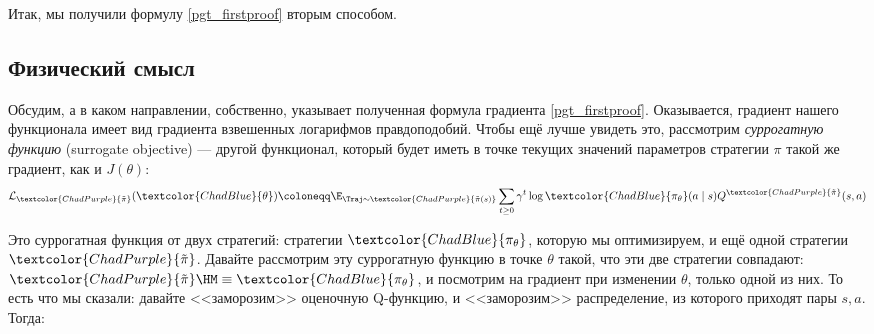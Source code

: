 Итак, мы получили формулу \eqref{pgt_firstproof} вторым способом.

\subsection{Физический смысл}

Обсудим, а в каком направлении, собственно, указывает полученная формула градиента \eqref{pgt_firstproof}. Оказывается, градиент нашего функционала имеет вид градиента взвешенных логарифмов правдоподобий. Чтобы ещё лучше увидеть это, рассмотрим \emph{суррогатную функцию} (surrogate objective) --- другой функционал, который будет иметь в точке текущих значений параметров стратегии $\pi$ такой же градиент, как и $J(\theta)$:
\begin{equation}\label{surrogateobj}
\mathcal{L}_{\textcolor{ChadPurple}{\tilde{\pi}}}(\textcolor{ChadBlue}{\theta}) \coloneqq \E_{\Traj \sim \textcolor{ChadPurple}{\tilde{\pi}(s)}} \sum_{t \ge 0} \gamma^t \log \textcolor{ChadBlue}{\pi_{\theta}}(a \mid s) Q^{\textcolor{ChadPurple}{\tilde{\pi}}}(s, a)
\end{equation}

Это суррогатная функция от двух стратегий: стратегии $\textcolor{ChadBlue}{\pi_{\theta}}$, которую мы оптимизируем, и ещё одной стратегии $\textcolor{ChadPurple}{\tilde{\pi}}$. Давайте рассмотрим эту суррогатную функцию в точке $\theta$ такой, что эти две стратегии совпадают: $\textcolor{ChadPurple}{\tilde{\pi}} \HM\equiv \textcolor{ChadBlue}{\pi_{\theta}}$, и посмотрим на градиент при изменении $\theta$, только одной из них. То есть что мы сказали: давайте <<заморозим>> оценочную Q-функцию, и <<заморозим>> распределение, из которого приходят пары $s, a$. Тогда:

